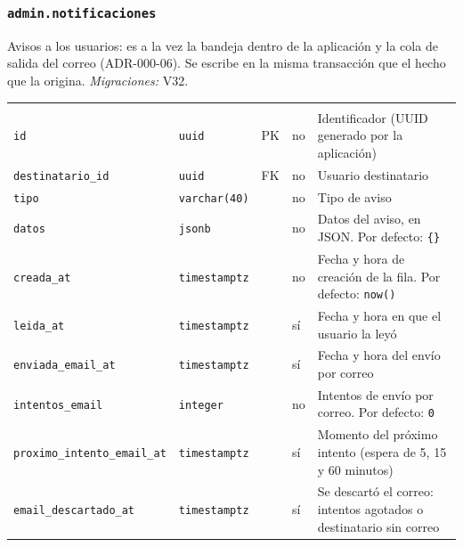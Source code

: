\subsubsection{\texorpdfstring{\texttt{admin.notificaciones}}{admin.notificaciones}}\label{dd:admin.notificaciones}

Avisos a los usuarios: es a la vez la bandeja dentro de la aplicación y la cola de salida del correo (ADR-000-06). Se escribe en la misma transacción que el hecho que la origina. \emph{Migraciones:} V32.

{\small
\begin{xltabular}{\textwidth}{@{}>{\raggedright\arraybackslash}p{3.6cm} >{\raggedright\arraybackslash}p{2.3cm} >{\raggedright\arraybackslash}p{1cm} >{\centering\arraybackslash}p{0.85cm} L@{}}
    \toprule
     &  &  &  &  \\
    \midrule
    \endfirsthead
    \toprule
     &  &  &  &  \\
    \midrule
    \endhead
    \bottomrule
    \endfoot
    \texttt{id} & \texttt{uuid} & PK & no & Identificador (UUID generado por la aplicación) \\
    \texttt{destinatario\_\allowbreak{}id} & \texttt{uuid} & FK & no & Usuario destinatario \\
    \texttt{tipo} & \texttt{varchar(\allowbreak{}40)} &  & no & Tipo de aviso \\
    \texttt{datos} & \texttt{jsonb} &  & no & Datos del aviso, en JSON. Por defecto: \texttt{\textquotesingle{}\{\}\textquotesingle{}} \\
    \texttt{creada\_\allowbreak{}at} & \texttt{timestamptz} &  & no & Fecha y hora de creación de la fila. Por defecto: \texttt{now(\allowbreak{})} \\
    \texttt{leida\_\allowbreak{}at} & \texttt{timestamptz} &  & sí & Fecha y hora en que el usuario la leyó \\
    \texttt{enviada\_\allowbreak{}email\_\allowbreak{}at} & \texttt{timestamptz} &  & sí & Fecha y hora del envío por correo \\
    \texttt{intentos\_\allowbreak{}email} & \texttt{integer} &  & no & Intentos de envío por correo. Por defecto: \texttt{0} \\
    \texttt{proximo\_\allowbreak{}intento\_\allowbreak{}email\_\allowbreak{}at} & \texttt{timestamptz} &  & sí & Momento del próximo intento (espera de 5, 15 y 60 minutos) \\
    \texttt{email\_\allowbreak{}descartado\_\allowbreak{}at} & \texttt{timestamptz} &  & sí & Se descartó el correo: intentos agotados o destinatario sin correo \\
\end{xltabular}
}

